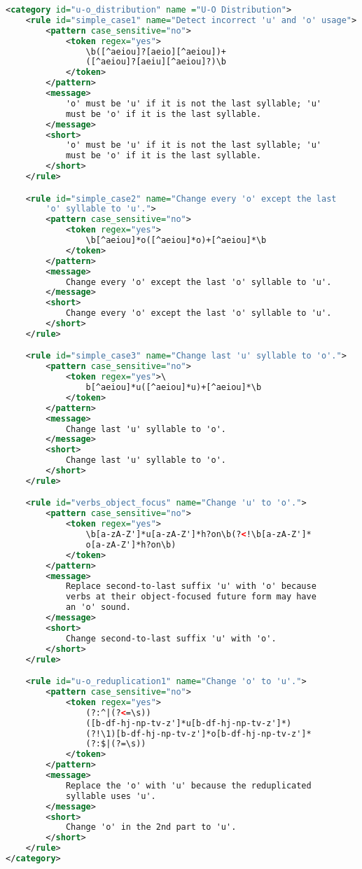 \begin{lstlisting}[language= XML, caption=Grammar for U-O Distribution]
<category id="u-o_distribution" name ="U-O Distribution">
    <rule id="simple_case1" name="Detect incorrect 'u' and 'o' usage">
        <pattern case_sensitive="no"> 
            <token regex="yes">
                \b([^aeiou]?[aeio][^aeiou])+
                ([^aeiou]?[aeiu][^aeiou]?)\b
            </token>
        </pattern>
        <message>
            'o' must be 'u' if it is not the last syllable; 'u' 
            must be 'o' if it is the last syllable.
        </message>
        <short>
            'o' must be 'u' if it is not the last syllable; 'u' 
            must be 'o' if it is the last syllable.
        </short>
    </rule>

    <rule id="simple_case2" name="Change every 'o' except the last 
        'o' syllable to 'u'.">
        <pattern case_sensitive="no"> 
            <token regex="yes">
                \b[^aeiou]*o([^aeiou]*o)+[^aeiou]*\b
            </token>
        </pattern>
        <message>
            Change every 'o' except the last 'o' syllable to 'u'.
        </message>
        <short>
            Change every 'o' except the last 'o' syllable to 'u'.
        </short>
    </rule>

    <rule id="simple_case3" name="Change last 'u' syllable to 'o'.">
        <pattern case_sensitive="no"> 
            <token regex="yes">\
                b[^aeiou]*u([^aeiou]*u)+[^aeiou]*\b
            </token>
        </pattern>
        <message>
            Change last 'u' syllable to 'o'.
        </message>
        <short>
            Change last 'u' syllable to 'o'.
        </short>
    </rule>

    <rule id="verbs_object_focus" name="Change 'u' to 'o'.">
        <pattern case_sensitive="no"> 
            <token regex="yes">
                \b[a-zA-Z']*u[a-zA-Z']*h?on\b(?<!\b[a-zA-Z']*
                o[a-zA-Z']*h?on\b)
            </token>
        </pattern>
        <message>
            Replace second-to-last suffix 'u' with 'o' because 
            verbs at their object-focused future form may have 
            an 'o' sound. 
        </message>
        <short>
            Change second-to-last suffix 'u' with 'o'.
        </short>
    </rule>

    <rule id="u-o_reduplication1" name="Change 'o' to 'u'.">
        <pattern case_sensitive="no"> 
            <token regex="yes">
                (?:^|(?<=\s))
                ([b-df-hj-np-tv-z']*u[b-df-hj-np-tv-z']*)
                (?!\1)[b-df-hj-np-tv-z']*o[b-df-hj-np-tv-z']*
                (?:$|(?=\s))
            </token>
        </pattern>
        <message>
            Replace the 'o' with 'u' because the reduplicated 
            syllable uses 'u'. 
        </message>
        <short>
            Change 'o' in the 2nd part to 'u'.
        </short>
    </rule>
</category>
\end{lstlisting}

